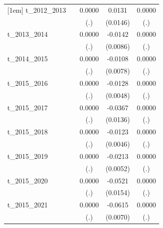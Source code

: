 \begin{table}[htbp]
\begin{tabular}{l*{4}{c}}
[1em]
t\_2012\_2013 &                     &      0.0000         &      0.0131         &      0.0000         \\
            &                     &         (.)         &    (0.0146)         &         (.)         \\
[1em]
t\_2013\_2014 &                     &      0.0000         &     -0.0142\sym{*}  &      0.0000         \\
            &                     &         (.)         &    (0.0086)         &         (.)         \\
[1em]
t\_2014\_2015 &                     &      0.0000         &     -0.0108         &      0.0000         \\
            &                     &         (.)         &    (0.0078)         &         (.)         \\
[1em]
t\_2015\_2016 &                     &      0.0000         &     -0.0128\sym{***}&      0.0000         \\
            &                     &         (.)         &    (0.0048)         &         (.)         \\
[1em]
t\_2015\_2017 &                     &      0.0000         &     -0.0367\sym{***}&      0.0000         \\
            &                     &         (.)         &    (0.0136)         &         (.)         \\
[1em]
t\_2015\_2018 &                     &      0.0000         &     -0.0123\sym{***}&      0.0000         \\
            &                     &         (.)         &    (0.0046)         &         (.)         \\
[1em]
t\_2015\_2019 &                     &      0.0000         &     -0.0213\sym{***}&      0.0000         \\
            &                     &         (.)         &    (0.0052)         &         (.)         \\
[1em]
t\_2015\_2020 &                     &      0.0000         &     -0.0521\sym{***}&      0.0000         \\
            &                     &         (.)         &    (0.0154)         &         (.)         \\
[1em]
t\_2015\_2021 &                     &      0.0000         &     -0.0615\sym{***}&      0.0000         \\
            &                     &         (.)         &    (0.0070)         &         (.)         \\

\end{tabular}
\end{table}
